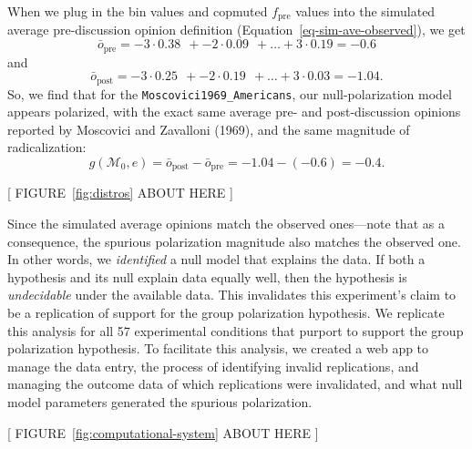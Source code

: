 \documentclass[preview]{article}
\newcommand{\nullmodel}{\mathcal{M}_0}
\begin{document}
When we plug in the bin values and copmuted $f_\mathrm{pre}$ values
into the simulated average pre-discussion opinion definition
(Equation~\ref{eq-sim-ave-observed}), we get \[
\bar{o}_\mathrm{pre} = -3 \cdot 0.38~~+-2\cdot 0.09~~+\ldots+3\cdot0.19 = -0.6
\] and \[
\bar{o}_\mathrm{post} = -3 \cdot 0.25~~+-2\cdot 0.19~~+\ldots+3\cdot0.03 = -1.04.
\] So, we find that for the \texttt{Moscovici1969\_Americans}, our
null-polarization model appears polarized, with the exact same average
pre- and post-discussion opinions reported by Moscovici and Zavalloni
(1969), and the same magnitude of radicalization: \[
g(\nullmodel, e) = \bar{o}_\mathrm{post} - \bar{o}_\mathrm{pre} = -1.04 - (-0.6) = - 0.4.
\]

\begin{center}
  [  FIGURE~\ref{fig:distros} ABOUT HERE  ] 
\end{center}

Since the simulated average opinions match the observed ones---note that
as a consequence, the spurious polarization magnitude also matches the
observed one. In other words, we \emph{identified} a null model that
explains the data. If both a hypothesis and its null explain data
equally well, then the hypothesis is \emph{undecidable} under the
available data. This invalidates this experiment's claim to be a
replication of support for the group polarization hypothesis. We
replicate this analysis for all 57 experimental conditions that purport
to support the group polarization hypothesis. To facilitate this
analysis, we created a web app to manage the data entry, the process of
identifying invalid replications, and managing the outcome data of which
replications were invalidated, and what null model parameters generated
the spurious polarization.

\begin{center}
[  FIGURE~\ref{fig:computational-system} ABOUT HERE  ]
\end{center}


\end{document}
